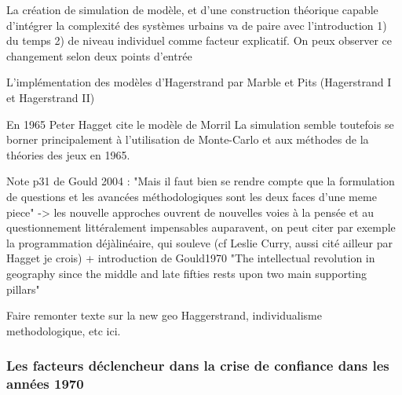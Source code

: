La création de simulation de modèle, et d'une construction théorique capable d'intégrer la complexité des systèmes urbains va de paire avec l'introduction 1) du temps 2) de niveau individuel comme facteur explicatif. On peux observer ce changement selon deux points d'entrée 

L'implémentation des modèles d'Hagerstrand par Marble et Pits (Hagerstrand I et Hagerstrand II) 
 
En 1965 Peter Hagget cite le modèle de Morril La simulation semble toutefois se borner principalement à l'utilisation de Monte-Carlo et aux méthodes de la théories des jeux en 1965. 

Note p31 de Gould 2004 : "Mais il faut bien se rendre compte que la formulation de questions et les avancées méthodologiques sont les deux faces d'une meme piece" -> les nouvelle approches ouvrent de nouvelles voies à la pensée et au questionnement littéralement impensables auparavent, on peut citer par exemple la programmation déjàlinéaire, qui souleve (cf Leslie Curry, aussi cité ailleur par Hagget je crois) + introduction de Gould1970 "The intellectual revolution in geography since the middle and late fifties rests upon two main supporting pillars"




Faire remonter texte sur la new geo Haggerstrand, individualisme methodologique, etc ici.

\subsubsection{Les facteurs déclencheur dans la crise de confiance dans les années 1970}

